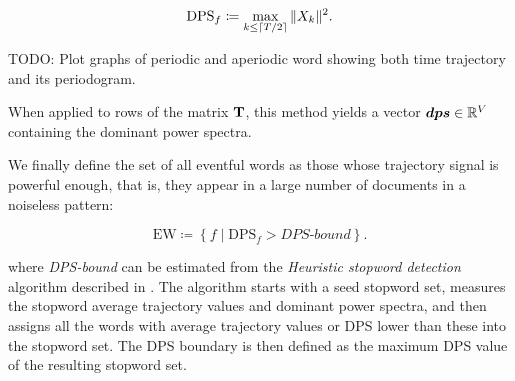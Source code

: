 \begin{equation}
	\text{DPS}_{f} \coloneqq \max\limits_{k \leq \lceil T / 2\rceil}{\|X_{k}\|^{2}}.
\end{equation}

{\color{red} TODO: Plot graphs of periodic and aperiodic word showing both time trajectory and its periodogram.}

When applied to rows of the matrix $\mathbf{T}$, this method yields a vector $\vect{DPS} \in \R^{\featcount}$ containing the dominant power spectra.

We finally define the set of all eventful words as those whose trajectory signal is powerful enough, that is, they appear in a large number of documents in a noiseless pattern:

\begin{equation}
	\text{EW} \coloneqq \left\{ f \mid \text{DPS}_{f} > \textit{DPS-bound} \right\}.
\end{equation}

where \textit{DPS-bound} can be estimated from the \textit{Heuristic stopword detection} algorithm described in \cite{event-detection}. The algorithm starts with a seed stopword set, measures the stopword average trajectory  values and dominant power spectra, and then assigns all the words with average trajectory values or DPS lower than these into the stopword set. The DPS boundary is then defined as the maximum DPS value of the resulting stopword set.